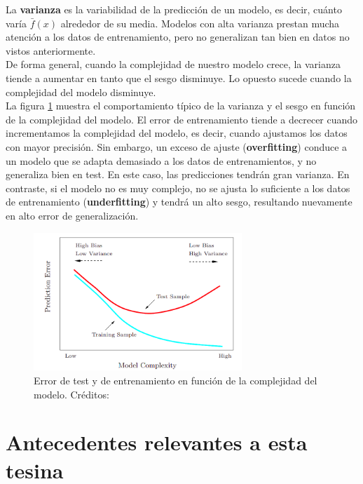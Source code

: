 La \textbf{varianza} es la variabilidad de la predicción de un modelo, es decir, cuánto varía $\bar{f}(x)$ alrededor de su media. Modelos con alta varianza prestan mucha atención a los datos de entrenamiento, pero no generalizan tan bien en datos no vistos anteriormente. \\

De forma general, cuando la complejidad de nuestro modelo crece, la varianza tiende a aumentar en tanto que el sesgo disminuye. Lo opuesto sucede cuando la complejidad del modelo disminuye. \\

La figura \ref{fig:tradeoff} muestra el comportamiento típico de la varianza y el sesgo en función de la complejidad del modelo. El error de entrenamiento tiende a decrecer cuando incrementamos la complejidad del modelo, es decir, cuando ajustamos los datos con mayor precisión. Sin embargo, un exceso de ajuste (\textbf{overfitting}) conduce a un modelo que se adapta demasiado a los datos de entrenamientos, y no generaliza bien en test. En este caso, las predicciones tendrán gran varianza. En contraste, si el modelo no es muy complejo, no se ajusta lo suficiente a los datos de entrenamiento (\textbf{underfitting}) y tendrá un alto sesgo, resultando nuevamente en alto error de generalización.\\ 

\begin{figure}[h!]
\begin{center}
  \includegraphics[width=0.7\textwidth]{Kap1/tradeoff.png} 
  \end{center}
 \caption{ Error de test y de entrenamiento en función de la complejidad del modelo. Créditos: \protect\cite{statisticallearning} }
\label{fig:tradeoff}
\end{figure}

\section{Antecedentes relevantes a esta tesina}

